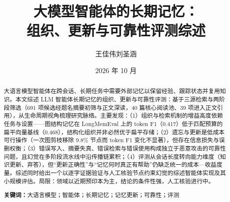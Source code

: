 \documentclass[UTF8, a4paper, zihao=-4]{ctexart}
\title{\textbf{大模型智能体的长期记忆：\\组织、更新与可靠性评测综述}}
\author{王佳伟\quad 刘圣涵}
\date{2026 年 10 月}
\begin{document}
\maketitle

\begin{abstract}
大语言模型智能体在跨会话、长期任务中需要外部记忆以保留经验、跟踪状态并复用知识。本文综述 LLM 智能体长期记忆的组织、更新与可靠性评测：基于三源检索与两阶段筛选（691 项候选经题名摘要初筛与正文深读，40 篇核心阅读池、39 项进入正文引用），从生命周期视角梳理研究脉络。主要发现：（1）组织与检索机制的增益高度依赖任务与设置——图结构记忆在 LongMemEval 上的 token F1（0.417）低于匹配预算的扁平向量基线（0.468），结构化组织并非必然优于扁平存储；（2）遗忘与更新是低成本可行操作（一次图剪枝移除 9.8\% 节点而 token F1 变化不显著），但存在信息损失与误删权衡；（3）错误写入、摘要失真、错误检索与错误使用构成独立于恶意攻击的可靠性问题，且幻觉在多阶段流水线中沿传播链累积；（4）评测从会话长度转向能力维度（知识更新、弃答），但``更新正确性''与``记忆何时真正有帮助''仍缺乏统一的成本—收益度量。综述同时给出一个以逐字证据验证与人工核验节点约束幻觉的综述智能体实现及其小规模评估。局限：领域以近期预印本为主，结论的条件性强，人工核验进行中。
\par\textbf{关键词：}大语言模型；智能体；长期记忆；记忆更新；可靠性；评测
\end{abstract}











\end{document}
